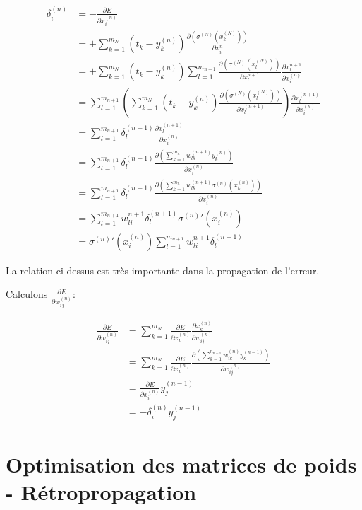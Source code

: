 \documentclass[11pt]{article}
\begin{document}
\begin{align}
\delta_{i}^{(n)}
& = -\frac{\partial E}{\partial x_{i}^{(n)}}\\
& = +\sum_{k=1}^{m_{N}}(t_{k}-y_{k}^{(n)})
\frac{\partial (\sigma^{(N)}(x_{k}^{(N)}))}{\partial x_{i}^{n}}\\
& = +\sum_{k=1}^{m_{N}}(t_{k}-y_{k}^{(n)})
\sum_{l=1}^{m_{n+1}}
\frac{\partial \left(\sigma^{(N)}(x_{l}^{(N)})\right)}
{\partial x_{l}^{n+1}}
\frac{\partial x_{l}^{n+1}}{\partial x_{i}^{(n)}}\\
& = \sum_{l=1}^{m_{n+1}}\left(\sum_{k=1}^{m_{N}}(t_{k}-y_{k}^{(n)})
\frac{\partial \left(\sigma^{(N)}(x_{l}^{(N)})\right)}
{\partial x_{l}^{(n+1)}}\right)
\frac{\partial x_{l}^{(n+1)}}{\partial x_{i}^{(n)}}\\
& = \sum_{l=1}^{m_{n+1}}\delta_{l}^{(n+1)}
\frac{\partial x_{l}^{(n+1)}}{\partial x_{i}^{(n)}}\\
& = \sum_{l=1}^{m_{n+1}}\delta_{l}^{(n+1)}
\frac{\partial \left(\sum_{k=1}^{m_{n}}w_{lk}^{(n+1)}y_{k}^{(n)}
\right)}{\partial x_{i}^{(n)}}\\
& = \sum_{l=1}^{m_{n+1}}\delta_{l}^{(n+1)}
\frac{\partial \left(\sum_{k=1}^{m_{n}}w_{lk}^{(n+1)}
\sigma^{(n)}(x_{k}^{(n)})
\right)}{\partial x_{i}^{(n)}}\\
& = \sum_{l=1}^{m_{n+1}}w_{li}^{n+1}\delta_{l}^{(n+1)}\sigma^{(n)}'(x_{i}^{(n)})\\
& = \sigma^{(n)}'(x_{i}^{(n)})\sum_{l=1}^{m_{n+1}}w_{li}^{n+1}\delta_{l}^{(n+1)}
\end{align}

La relation ci-dessus est très importante dans la propagation de l'erreur.

Calculons $\frac{\partial E}{\partial w_{ij}^{(n)}}$:

\begin{align}
\frac{\partial E}{\partial w_{ij}^{(n)}}
& = \sum_{k=1}^{m_{N}}\frac{\partial E}{\partial x_{k}^{(n)}}
\frac{\partial x_{k}^{(n)}}{\partial w_{ij}^{(n)}}\\
& = \sum_{k=1}^{m_{N}}\frac{\partial E}{\partial x_{k}^{(n)}}
\frac{\partial (\sum_{k=1}^{n_{n-1}}w_{ik}^{(n)}y_{k}^{(n-1)})}
{\partial w_{ij}^{(n)}}\\
& = \frac{\partial E}{\partial x_{i}^{(n)}}y_{j}^{(n-1)}\\
& = -\delta_{i}^{(n)}y_{j}^{(n-1)}
\end{align}


\section{Optimisation des matrices de poids - Rétropropagation}
\label{sec-6}
\end{document}
